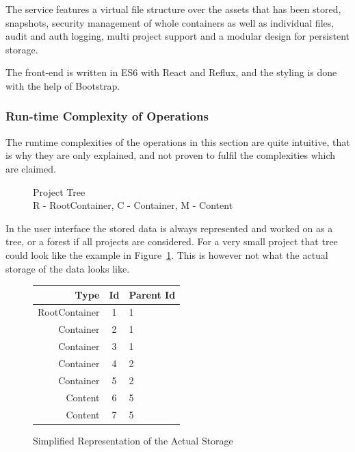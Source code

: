 \documentclass[a4paper,12pt]{article}
\begin{document}
The service features a virtual file structure over the assets that has been stored, snapshots,
security management of whole containers as well as individual files, audit and auth logging, multi
project support and a modular design for persistent storage.

The front-end is written in ES6 with React and Reflux, and the styling is done with the help of
Bootstrap.

\subsubsection{Run-time Complexity of Operations}
The runtime complexities of the operations in this section are quite intuitive, that is why they 
are only explained, and not proven to fulfil the complexities which are claimed. 

\begin{figure}[H] 
    \caption{Project Tree\\R - RootContainer, C - Container, M - Content}
    \label{fig:project_tree}
\end{figure}

In the user interface the stored data is always represented and worked on as a tree, or a forest if
all projects are considered. For a very small project that tree could look like the example in
Figure~\ref{fig:project_tree}. This is however not what the actual storage of the data looks like.

\begin{figure}[H] 
    \centering
    \renewcommand{\arraystretch}{1.3}
    \begin{tabular}{|r|c|l|}
        \hline
        \textbf{Type} & \textbf{Id} & \textbf{Parent Id} \\
        \hline
        RootContainer & 1 & 1 \\
        Container     & 2 & 1 \\
        Container     & 3 & 1 \\
        Container     & 4 & 2 \\
        Container     & 5 & 2 \\
        Content       & 6 & 5 \\
        Content       & 7 & 5 \\
        \hline
    \end{tabular}
    \renewcommand{\arraystretch}{1.0}
    \caption{Simplified Representation of the Actual Storage}
    \label{fig:storage}
\end{figure}
\end{document}
